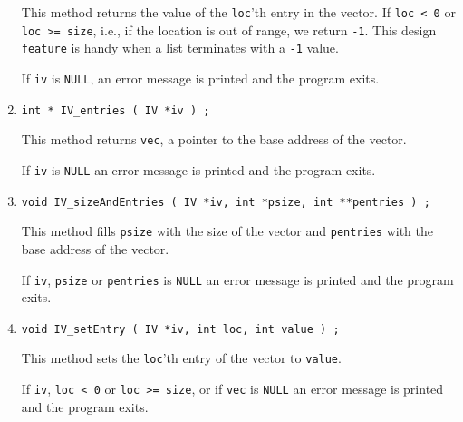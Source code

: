 \begin{enumerate}
\begin{verbatim}
\end{verbatim}
This method returns the value of the {\tt loc}'th entry
in the vector.
If {\tt loc < 0} or {\tt loc >= size}, i.e., if the location is
out of range, we return {\tt -1}.
This design {\tt feature} is handy when a list terminates with a
{\tt -1} value.
\par {}
If {\tt iv} is {\tt NULL},
an error message is printed and the program exits.
\item
\begin{verbatim}
int * IV_entries ( IV *iv ) ;
\end{verbatim}
This method returns {\tt vec},
a pointer to the base address of the vector.
\par {}
If {\tt iv} is {\tt NULL}
an error message is printed and the program exits.
\item
\begin{verbatim}
void IV_sizeAndEntries ( IV *iv, int *psize, int **pentries ) ;
\end{verbatim}
This method fills {\tt *psize} with the size of the vector
and {\tt *pentries} with the base address of the vector.
\par {}
If {\tt iv}, {\tt psize} or {\tt pentries} is {\tt NULL}
an error message is printed and the program exits.
\item
\begin{verbatim}
void IV_setEntry ( IV *iv, int loc, int value ) ;
\end{verbatim}
This method sets the {\tt loc}'th entry of the vector to {\tt value}.
\par {}
If {\tt iv}, {\tt loc < 0} or {\tt loc >= size}, 
or if {\tt vec} is {\tt NULL}
an error message is printed and the program exits.
\end{enumerate}
\par
